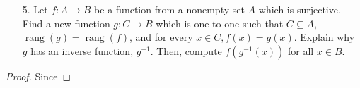\documentclass[10pt]{article}
\theoremstyle{definition}
\theoremstyle{plain}
\DeclareMathOperator\rang{rang}
\begin{document}
\pagebreak



\begin{enumerate}
\item[5.] Let $f:A \to B$ be a function from a nonempty set $A$ which is surjective.  Find a new function $g:C \to B$ which is one-to-one such that $C \subseteq A$, $\rang(g) = \rang(f)$, and for every $x \in C, f(x) = g(x)$.  Explain why $g$ has an inverse function, $g^{-1}$.  Then, compute $f(g^{-1}(x))$ for all $x \in B$.
\end{enumerate}



\begin{proof}
  Since
\end{proof}
\end{document}
